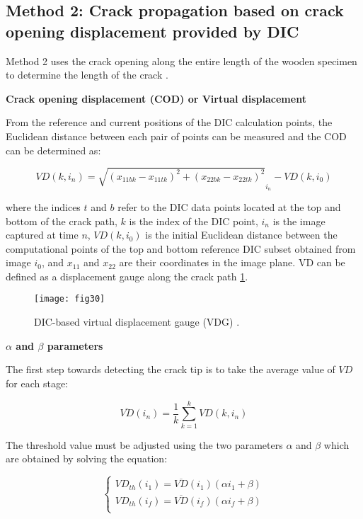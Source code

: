 \subsection{Method 2: Crack propagation based on crack opening displacement provided by DIC}

Method 2 uses the crack opening along the entire length of the wooden specimen to determine the length of the crack \citep{FilhoJ2022}.

\textbf{Crack opening displacement (COD) or Virtual displacement}

From the reference and current positions of the DIC calculation points, the Euclidean distance between each pair of points can be measured and the COD can be determined as:

\begin{equation}
	VD(k,i_n)=\sqrt{(x_{11bk}-x_{11tk})^2 + (x_{22bk}-x_{22tk})^2}_{i_n} - VD(k,i_0)
	\label{eq:eq23}
\end{equation}

where the indices $t$ and $b$ refer to the DIC data points located at the top and bottom of the crack path, $k$ is the index of the DIC point, $i_n$ is the image captured at time $n$, $VD(k, i_0)$ is the initial Euclidean distance between the computational points of the top and bottom reference DIC subset obtained from image $i_0$, and $x_{11}$ and $x_{22}$ are their coordinates in the image plane. VD can be defined as a displacement gauge along the crack path \ref{fig:fig30}.

\begin{figure}[htp]
	\centering
	\texttt{[image: fig30]}
	\caption{DIC-based virtual displacement gauge (VDG) \citep{FilhoJ2022}.}
	\label{fig:fig30}
\end{figure}

\textbf{$\alpha$ and $\beta$ parameters}

The first step towards detecting the crack tip is to take the average value of $VD$ for each stage:

\begin{equation}
	\overline{VD}(i_n)=\frac{1}{k} \sum_{k=1}^{k}VD(k,i_n)
	\label{eq:eq24}
\end{equation}

The threshold value must be adjusted using the two parameters $\alpha$ and $\beta$ which are obtained by solving the equation:

\begin{equation}
	\begin{cases}
		VD_{th}(i_1)=\overline{VD}(i_1)(\alpha i_1 +\beta)\\
		VD_{th}(i_f)=\overline{VD}(i_f)(\alpha i_f +\beta)\\ 
	\end{cases}
\label{eq:eq25}
\end{equation}

